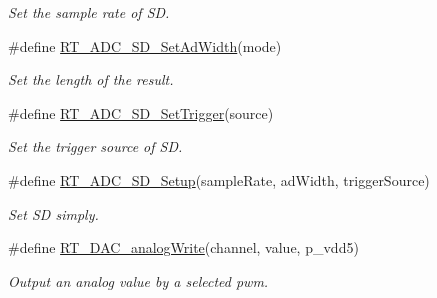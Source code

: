 \begin{DoxyCompactItemize}
\begin{DoxyCompactList}\small\item\em Set the sample rate of SD. \end{DoxyCompactList}\item 
\#define \mbox{\hyperlink{a00002_acb989d89893ac99af984979cb9e8df2a}{R\+T\+\_\+\+A\+D\+C\+\_\+\+S\+D\+\_\+\+Set\+Ad\+Width}}(mode)
\begin{DoxyCompactList}\small\item\em Set the length of the result. \end{DoxyCompactList}\item 
\#define \mbox{\hyperlink{a00002_a11bf38478bd196acd1f179115e714dfc}{R\+T\+\_\+\+A\+D\+C\+\_\+\+S\+D\+\_\+\+Set\+Trigger}}(source)
\begin{DoxyCompactList}\small\item\em Set the trigger source of SD. \end{DoxyCompactList}\item 
\#define \mbox{\hyperlink{a00002_a312f152517ab50c1cda791e118dd4473}{R\+T\+\_\+\+A\+D\+C\+\_\+\+S\+D\+\_\+\+Setup}}(sample\+Rate,  ad\+Width,  trigger\+Source)
\begin{DoxyCompactList}\small\item\em Set SD simply. \end{DoxyCompactList}\item 
\#define \mbox{\hyperlink{a00002_ab44c37130776b81ef554d8967fcf9e62}{R\+T\+\_\+\+D\+A\+C\+\_\+analog\+Write}}(channel,  value,  p\+\_\+vdd5)
\begin{DoxyCompactList}\small\item\em Output an analog value by a selected pwm. \end{DoxyCompactList}\end{DoxyCompactItemize}
